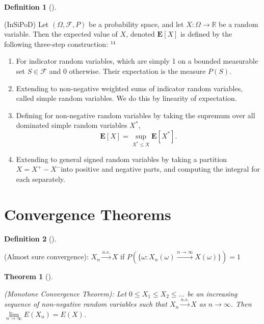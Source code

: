 \documentclass[
  letterpaper,
  DIV=11,
  numbers=noendperiod]{scrreprt}
\theoremstyle{definition}
\newtheorem{definition}{Definition}[chapter]
\theoremstyle{plain}
\newtheorem{theorem}{Theorem}[chapter]
\theoremstyle{remark}
\begin{document}
\leavevmode{}%
\begin{definition}[]\label{def-InSiPoD}

(InSiPoD) Let \((\Omega, \mathcal{F}, P)\) be a probability space, and
let \(X: \Omega \rightarrow \mathbb{R}\) be a random variable. Then the
expected value of \(X\), denoted \(\mathbf{E}[X]\) is defined by the
following three-step construction: \({ }^{14}\)

\begin{enumerate}
\def\labelenumi{\arabic{enumi}.}
\item
  For indicator random variables, which are simply 1 on a bounded
  measurable set \(S \in \mathcal{F}\) and 0 otherwise. Their
  expectation is the measure \(P(S)\).
\item
  Extending to non-negative weighted sums of indicator random variables,
  called simple random variables. We do this by linearity of
  expectation.
\item
  Defining for non-negative random variables by taking the supremum over
  all dominated simple random variables \(X^*\), \[
  \mathbf{E}[X]=\sup _{X^* \leq X} \mathbf{E}\left[X^*\right] .
  \]
\item
  Extending to general signed random variables by taking a partition
  \(X=X^{+}-X^{-}\)into positive and negative parts, and computing the
  integral for each separately.
\end{enumerate}

\end{definition}

\hypertarget{convergence-theorems}{%
\section*{Convergence Theorems}\label{convergence-theorems}}


\leavevmode{}%
\begin{definition}[]\label{def-Almost-sure-convergence}

(Almost sure convergence): \(X_n \xrightarrow{a.s.}X\) if
\(P(\{\omega: X_n(\omega) \xrightarrow{n\to \infty} X(\omega)\}) = 1\)

\end{definition}

\leavevmode{}%
\begin{theorem}[]\label{thm-Monotone-Convergence-Theorem}

(Monotone Convergence Theorem): Let \(0 \leq X_1 \leq X_2 \leq ...\) be
an \textit{increasing sequence of non-negative} random variables such
that \(X_n \xrightarrow{a.s.} X\) as \(n\to \infty\). Then
\(\lim\limits_{n\to \infty}E(X_n) = E(X)\).

\end{theorem}
\end{document}
